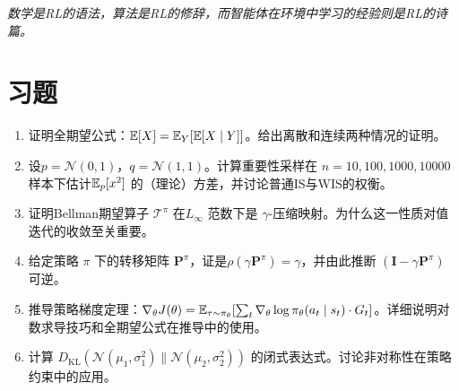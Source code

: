 \emph{数学是RL的语法，算法是RL的修辞，而智能体在环境中学习的经验则是RL的诗篇。}

\section*{习题}

\begin{enumerate}
    \item 证明全期望公式：$\mathbb{E}[X] = \mathbb{E}_Y[\mathbb{E}[X \mid Y]]$。给出离散和连续两种情况的证明。
    \item 设$p = \mathcal{N}(0, 1)$，$q = \mathcal{N}(1, 1)$。计算重要性采样在 $n = 10, 100, 1000, 10000$ 样本下估计$\mathbb{E}_p[x^2]$ 的（理论）方差，并讨论普通IS与WIS的权衡。
    \item 证明Bellman期望算子 $\mathcal{T}^{\pi}$ 在$L_\infty$ 范数下是 $\gamma$-压缩映射。为什么这一性质对值迭代的收敛至关重要。
    \item 给定策略 $\pi$ 下的转移矩阵 $\mathbf{P}^{\pi}$，证是$\rho(\gamma \mathbf{P}^{\pi}) = \gamma$，并由此推断 $(\mathbf{I} - \gamma \mathbf{P}^{\pi})$ 可逆。
    \item 推导策略梯度定理：$\nabla_\theta J(\theta) = \mathbb{E}_{\tau \sim \pi_\theta}[\sum_t \nabla_\theta \log \pi_\theta(a_t \mid s_t) \cdot G_t]$。详细说明对数求导技巧和全期望公式在推导中的使用。
    \item 计算 $D_{\mathrm{KL}}(\mathcal{N}(\mu_1, \sigma_1^2) \| \mathcal{N}(\mu_2, \sigma_2^2))$ 的闭式表达式。讨论非对称性在策略约束中的应用。
\end{enumerate}
